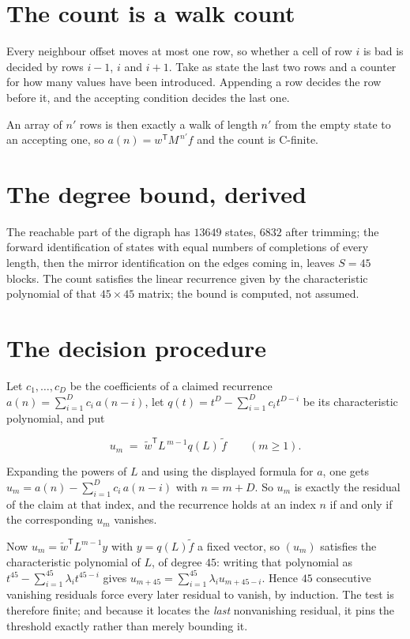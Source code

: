 \documentclass[11pt]{article}
\theoremstyle{definition}
\begin{document}
\section{The count is a walk count}

Every neighbour offset moves at most one row, so whether a cell of row $i$ is bad is decided by rows $i-1$, $i$ and $i+1$. Take as state the last two rows and a counter for how many values have been introduced. Appending a row decides the row before it, and the accepting condition decides the last one.

An array of $n'$ rows is then exactly a walk of length $n'$ from the empty state to an accepting one, so $a(n) = w^{\mathsf T}M^{\,n'}f$ and the count is C-finite.

\section{The degree bound, derived}

The reachable part of the digraph has $13649$ states, $6832$ after trimming; the forward identification of states with equal numbers of completions of every length, then the mirror identification on the edges coming in, leaves $S = 45$ blocks. The count satisfies the linear recurrence given by the characteristic polynomial of that $45\times45$ matrix; the bound is computed, not assumed.

\section{The decision procedure}

Let $c_1,\dots,c_D$ be the coefficients of a claimed recurrence $a(n) = \sum_{i=1}^{D} c_i\,a(n-i)$, let $q(t) = t^{D} - \sum_{i=1}^{D} c_i t^{D-i}$ be its characteristic polynomial, and put

\[u_m \;=\; \tilde w^{\mathsf T} L^{\,m-1} q(L)\,\tilde f \qquad (m \ge 1).\]

Expanding the powers of $L$ and using the displayed formula for $a$, one gets $u_m = a(n) - \sum_{i=1}^{D} c_i\,a(n-i)$ with $n = m + D$. So $u_m$ is exactly the residual of the claim at that index, and the recurrence holds at an index $n$ if and only if the corresponding $u_m$ vanishes.

Now $u_m = \tilde w^{\mathsf T} L^{m-1} y$ with $y = q(L)\tilde f$ a fixed vector, so $(u_m)$ satisfies the characteristic polynomial of $L$, of degree $45$: writing that polynomial as $t^{45} - \sum_{i=1}^{45} \lambda_i t^{45-i}$ gives $u_{m+45} = \sum_{i=1}^{45} \lambda_i u_{m+45-i}$. Hence $45$ consecutive vanishing residuals force every later residual to vanish, by induction. The test is therefore finite; and because it locates the {\itshape last} nonvanishing residual, it pins the threshold exactly rather than merely bounding it.
\end{document}
